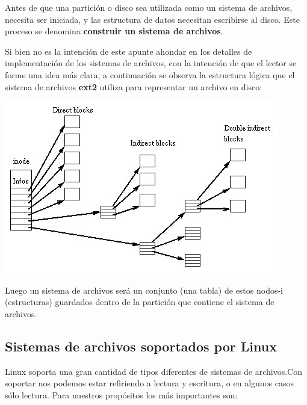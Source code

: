 \documentclass[12pt]{article}
\begin{document}
Antes de que una partición o disco sea utilizada como un sistema de 
archivos, necesita ser iniciada, y las estructura de datos necesitan 
escribirse al disco. Este proceso se denomina \textbf{construir un sistema
de archivos}.

Si bien no es la intención de este apunte ahondar en los detalles de 
implementación de los sistemas de archivos, con la intención de que el 
lector se forme una idea más clara, a continuación se observa la estructura
lógica que el sistema de archivos \textbf{ext2} utiliza para representar
un archivo en disco: 

\begin{center}
 \includegraphics{Ext2-inode.jpg}
\end{center}

Luego un sistema de archivos será un conjunto (una tabla) de estos
nodos-i (estructuras) guardados dentro de la partición que contiene el 
sistema de archivos. 



\subsection*{Sistemas de archivos soportados por Linux}

Linux soporta una gran cantidad de tipos diferentes de sistemas de archivos.Con soportar nos podemos estar refiriendo a lectura y escritura, o en 
algunos casos sólo lectura. Para nuestros propósitos los más importantes 
son:
\end{document}
